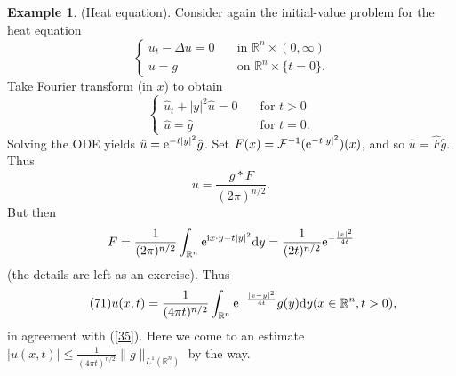 \documentclass[hyperref,UTF8,12pt]{article}
\numberwithin{equation}{subsection}
\theoremstyle{plain}
\theoremstyle{definition}
\newtheorem{example}{Example}
\numberwithin{theorem}{section}
\numberwithin{lemma}{section}
\numberwithin{proposition}{section}
\numberwithin{remark}{section}
\numberwithin{corollary}{section}
\numberwithin{definition}{section}
\numberwithin{problem}{section}
\numberwithin{example}{section}
\def\e{\textup{e}}
\def\i{\textup{i}}
\def\dif{\textup{d}}
\newcommand{\mr}{\mathbb{R}}
\renewcommand{\leq}{\leqslant}
\begin{document}
\begin{example}
(Heat equation). Consider again the initial-value problem for the heat equation 
\[\left\{\begin{aligned}
	u_t-\Delta u=0&\quad\text{in } \mr^n\times(0,\infty)\\
	u=g&\quad\text{on } \mr^n\times\{t=0\}.
\end{aligned}\right.\]Take Fourier transform (in $x$) to obtain \[\left\{\begin{aligned}
\hat{u}_t+|y|^2\hat{u}=0&\quad\text{for } t>0\\
\hat{u}=\hat{g}&\quad\text{for } t=0.
\end{aligned}\right.\]Solving the ODE yields $\hat{u}=\e^{-t|y|^2}\hat{g}$. Set $F(x)=\mathcal{F}^{-1}(\e^{-t|y|^2})(x)$, and so $\hat{u}=\hat{F}\hat{g}$. Thus \[u=
\frac{g *F}{(2\pi)^{n/2}}.\]But then \[F=\frac{1}{(2\pi)^{n/2}}\int_{\mr^n}
\e^{\i x\cdot y-t|y|^2}\dif y=\frac{1}{(2t)^{n/2}} \e^{-\frac{|x|^2}{4t}}\](the details are left as an exercise). Thus \[\tag{71}\label{71}u(x,t)=\frac{1}{(4\pi t)^{n/2}}\int_{\mr^n}
\e^{-\frac{|x-y|^2}{4t}}g(y)\dif y(x\in\mr^n, t>0),\]in agreement with (\ref{35}). Here we come to an estimate $|u(x,t)|\leq\frac{1}{(4\pi t)^{n/2}}\|g\|_{L^1(\mr^n)}$ by the way.
\end{example}
\end{document}

